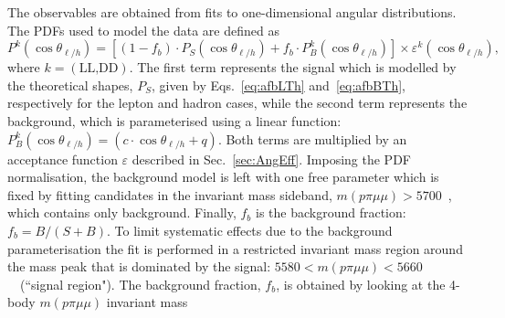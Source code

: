 The observables are obtained from fits to one-dimensional angular distributions.
%
%
The PDFs used to model the data are defined as
%
\begin{equation}
P^k(\cos\theta_{\ell/h}) = [(1-f_b) \cdot P_S(\cos\theta_{\ell/h})  + 
		f_b  \cdot  P_B^k(\cos\theta_{\ell/h}) ] \times \varepsilon^k(\cos \theta_{\ell/h}),
\end{equation}
%
where $k=(\text{LL,DD})$. The first term represents the signal which is modelled by the theoretical shapes, $P_S$, 
given by Eqs.~\ref{eq:afbLTh} and~\ref{eq:afbBTh}, respectively for the lepton and hadron cases, while the second 
term represents the background, which is parameterised using a linear function: 
\mbox{$P_B^k(\cos\theta_{\ell/h}) = (c \cdot \cos\theta_{\ell/h}+q)$}. Both terms are multiplied by an acceptance 
function $\varepsilon$ described in Sec.~\ref{sec:AngEff}. Imposing the PDF normalisation, the background model
is left with one free parameter which is fixed by fitting candidates in the \Lb invariant mass sideband, $m(p\pi\mu\mu) > 5700$~\mevcc, 
which contains only background. Finally, $f_b$ is the background fraction: $f_b = B/(S+B)$.
To limit systematic effects due to the background parameterisation
the fit is performed in a restricted invariant mass region around the \Lb mass peak that is dominated by the signal:
$5580 < m(p\pi\mu\mu) < 5660$~\mevcc ~(``signal region").
%
The background fraction, $f_b$, is obtained by looking at the 4-body $m(p\pi\mu\mu)$ invariant mass
